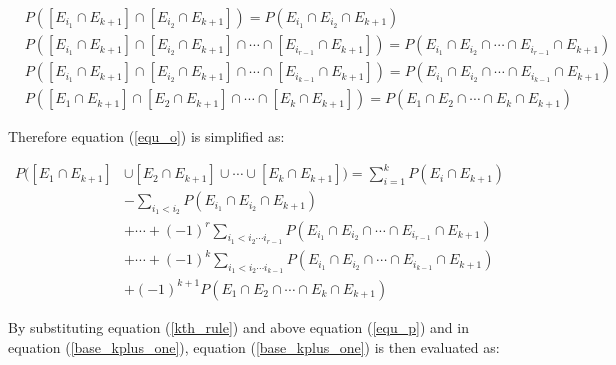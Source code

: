 \documentclass[a4paper]{article}
\begin{document}
    \begin{equation*}
        \begin{split}
            &P([E_{i_1} \cap E_{k + 1}] \cap [E_{i_2} \cap E_{k + 1}]) = P(E_{i_1} \cap E_{i_2} \cap E_{k + 1}) \\
            &P([E_{i_1} \cap E_{k + 1}] \cap [E_{i_2} \cap E_{k + 1}] \cap \cdots \cap [E_{i_{r - 1}} \cap E_{k + 1}]) = P(E_{i_1} \cap E_{i_2} \cap \cdots \cap E_{i_{r - 1}} \cap E_{k + 1}) \\
            &P([E_{i_1} \cap E_{k + 1}] \cap [E_{i_2} \cap E_{k + 1}] \cap \cdots \cap [E_{i_{k - 1}} \cap E_{k + 1}]) = P(E_{i_1} \cap E_{i_2} \cap \cdots \cap E_{i_{k - 1}} \cap E_{k + 1}) \\
            &P([E_1 \cap E_{k + 1}] \cap [E_2 \cap E_{k + 1}] \cap \cdots \cap [E_k \cap E_{k + 1}]) = P(E_1 \cap E_2 \cap \cdots \cap E_k \cap E_{k + 1})
        \end{split}
    \end{equation*}

    Therefore equation (\ref{equ_o}) is simplified as:

    \begin{equation} \label{equ_p}
        \begin{split}
            P([E_1 \cap E_{k + 1}] &\cup [E_2 \cap E_{k + 1}] \cup \cdots \cup [E_k \cap E_{k + 1}]) = \sum_{i = 1}^{k} P(E_i \cap E_{k + 1}) \\
            & - \sum_{i_1 < i_2} P(E_{i_1} \cap E_{i_2} \cap E_{k + 1}) \\
            & + \cdots + {(-1)}^{r} \sum_{i_1 < i_2 \cdots i_{r - 1}} P(E_{i_1} \cap E_{i_2} \cap \cdots \cap E_{i_{r - 1}} \cap E_{k + 1}) \\
            & + \cdots + {(-1)}^{k} \sum_{i_1 < i_2 \cdots i_{k - 1}} P(E_{i_1} \cap E_{i_2} \cap \cdots \cap E_{i_{k - 1}} \cap E_{k + 1}) \\
            & + {(-1)}^{k + 1} P(E_1 \cap E_2 \cap \cdots \cap E_k \cap E_{k + 1})
        \end{split}
    \end{equation}

    By substituting equation (\ref{kth_rule}) and above equation (\ref{equ_p}) and in equation (\ref{base_kplus_one}), equation (\ref{base_kplus_one}) is then evaluated as:
\end{document}
